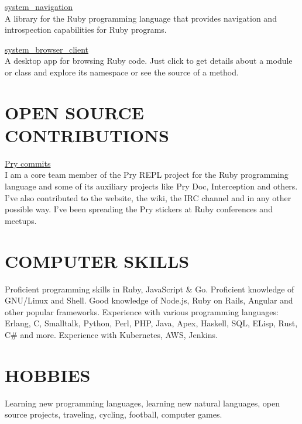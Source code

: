 \documentclass{res}
\begin{document}
\begin{resume}
  \href{https://github.com/kyrylo/system_navigation}{system\_navigation}
  \\
  A library for the Ruby programming language that provides navigation and
  introspection capabilities for Ruby programs.

  \href{https://github.com/kyrylo/system_browser_client}{system\_browser\_client}
  \\
  A desktop app for browsing Ruby code. Just click to get details about a module
  or class and explore its namespace or see the source of a method.

  \section{OPEN SOURCE CONTRIBUTIONS}

  \href{https://github.com/pry/pry/commits?author=kyrylo}{Pry commits}
  \\
  I am a core team member of the Pry REPL project for the Ruby programming
  language and some of its auxiliary projects like Pry Doc, Interception and
  others. I've also contributed to the website, the wiki, the IRC channel and in
  any other possible way. I've been spreading the Pry stickers at Ruby
  conferences and meetups.

  \section{COMPUTER SKILLS}

  Proficient programming skills in Ruby, JavaScript \& Go. Proficient knowledge
  of GNU/Linux and Shell. Good knowledge of Node.js, Ruby on Rails, Angular and
  other popular frameworks. Experience with various programming languages:
  Erlang, C, Smalltalk, Python, Perl, PHP, Java, Apex, Haskell, SQL, ELisp,
  Rust, C# and more. Experience with Kubernetes, AWS, Jenkins.

  \section{HOBBIES}

  Learning new programming languages, learning new natural languages, open
  source projects, traveling, cycling, football, computer games.

\end{resume}
\end{document}
